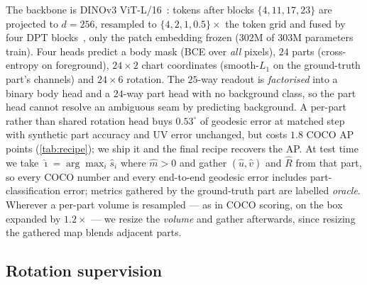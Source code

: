 The backbone is DINOv3 ViT-L/16~\cite{dinov3}: tokens after blocks $\{4,11,17,23\}$ are projected
to $d{=}256$, resampled to $\{4,2,1,0.5\}\times$ the token grid and fused by four DPT
blocks~\cite{ranftl2021dpt}, only the patch embedding frozen ($302$M of $303$M parameters train).
Four heads predict a body mask (BCE over \emph{all} pixels), $24$ parts (cross-entropy on
foreground), $24{\times}2$ chart coordinates (smooth-$L_1$ on the ground-truth part's channels) and
$24{\times}6$ rotation. The $25$-way readout is \emph{factorised} into a binary body head and a
$24$-way part head with no background class, so the part head cannot resolve an ambiguous seam by
predicting background. A per-part rather than shared rotation head buys $0.53^\circ$ of geodesic
error at matched step with synthetic part accuracy and UV error unchanged, but costs $1.8$ COCO AP
points (\cref{tab:recipe}); we ship it and the final recipe recovers the AP. At test time we take
$\hat\imath=\arg\max_i\hat s_i$ where $\hat m>0$ and gather $(\hat u,\hat v)$ and $\hat R$ from
that part, so every COCO number and every end-to-end geodesic error includes part-classification
error; metrics gathered by the ground-truth part are labelled \emph{oracle}. Wherever a per-part
volume is resampled --- as in COCO scoring, on the box expanded by $1.2\times$ --- we resize the
\emph{volume} and gather afterwards, since resizing the gathered map blends adjacent parts.

\subsection{Rotation supervision}
\label{sec:rotsup}

